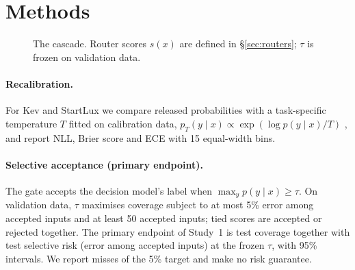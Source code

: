 \documentclass[11pt]{article}
\begin{document}
\section{Methods}

\begin{figure}[t]
\centering
{}
\caption{The cascade. Router scores $s(x)$ are defined in \S\ref{sec:routers}; $\tau$ is frozen on validation data.}
\label{fig:system}
\end{figure}

\paragraph{Recalibration.}
For Kev and StartLux we compare released probabilities with a task-specific temperature $T$ fitted on calibration data, $p_T(y\mid x)\propto\exp(\log p(y\mid x)/T)$ \citep{guo2017calibration}, and report NLL, Brier score and ECE with 15 equal-width bins.

\paragraph{Selective acceptance (primary endpoint).}
The gate accepts the decision model's label when $\max_y p(y\mid x)\ge\tau$. On validation data, $\tau$ maximises coverage subject to at most 5\% error among accepted inputs and at least 50 accepted inputs; tied scores are accepted or rejected together. The primary endpoint of Study~1 is test coverage together with test selective risk (error among accepted inputs) at the frozen $\tau$, with 95\% intervals. We report misses of the 5\% target and make no risk guarantee.
\end{document}
